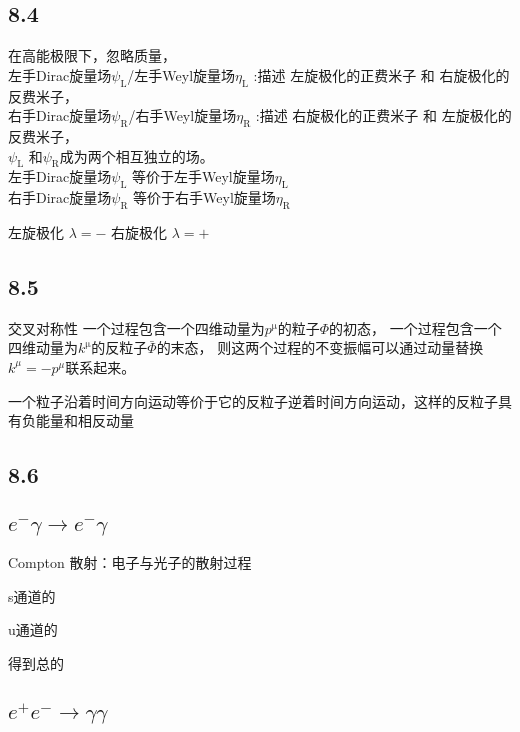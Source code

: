 \subsection{8.4}


在高能极限下，忽略质量，
\\左手Dirac旋量场$\psi_\mathrm{L}$/左手Weyl旋量场$\eta_\mathrm{L}$ :描述 左旋极化的正费米子 和 右旋极化的反费米子，
\\右手Dirac旋量场$\psi_\mathrm{R}$/右手Weyl旋量场$\eta_\mathrm{R}$ :描述 右旋极化的正费米子 和 左旋极化的反费米子，
\\$\psi_\mathrm{L}$ 和$\psi_\mathrm{R}$成为两个相互独立的场。
\\左手Dirac旋量场$\psi_\mathrm{L}$ 等价于左手Weyl旋量场$\eta_\mathrm{L}$ 
\\右手Dirac旋量场$\psi_\mathrm{R}$ 等价于右手Weyl旋量场$\eta_\mathrm{R}$

左旋极化 $\lambda=-$
右旋极化 $\lambda=+$


\subsection{8.5}

交叉对称性
一个过程包含一个四维动量为$p^\mathrm{\mu}$的粒子$\Phi$的初态，
一个过程包含一个四维动量为$k^\mathrm{\mu}$的反粒子$\bar{\Phi}$的末态，
则这两个过程的不变振幅可以通过动量替换$k^\mu=-p^\mu$联系起来。

一个粒子沿着时间方向运动等价于它的反粒子逆着时间方向运动，这样的反粒子具有负能量和相反动量


\subsection{8.6}

\subsection{$e^{-}\gamma\to e^{-}\gamma$}
Compton 散射：电子与光子的散射过程

s通道的

u通道的

得到总的



\subsection{$e^+e^-\to\gamma\gamma$}





